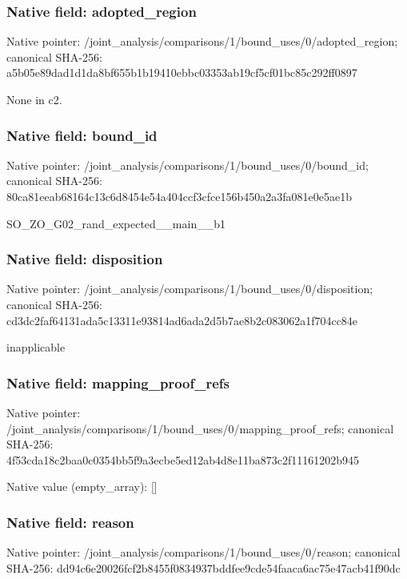 \documentclass[10pt,a4paper]{article}
\begin{document}
\subsubsection{Native field: adopted\_\allowbreak{}region}
Native pointer: /joint\_\allowbreak{}analysis/comparisons/1/bound\_\allowbreak{}uses/0/adopted\_\allowbreak{}region; canonical SHA-256: a5b05e89dad1d1da8bf655b1b19410ebbc03353ab19cf5cf01bc85c292ff0897

\begingroup\raggedright\sloppy None in c2.\par\endgroup

\subsubsection{Native field: bound\_\allowbreak{}id}
Native pointer: /joint\_\allowbreak{}analysis/comparisons/1/bound\_\allowbreak{}uses/0/bound\_\allowbreak{}id; canonical SHA-256: 80ca81eeab68164c13c6d8454e54a404ccf3cfce156b450a2a3fa081e0e5ae1b

\begingroup\raggedright\sloppy SO\_\allowbreak{}ZO\_\allowbreak{}G02\_\allowbreak{}rand\_\allowbreak{}expected\_\allowbreak{}\_\allowbreak{}main\_\allowbreak{}\_\allowbreak{}b1\par\endgroup

\subsubsection{Native field: disposition}
Native pointer: /joint\_\allowbreak{}analysis/comparisons/1/bound\_\allowbreak{}uses/0/disposition; canonical SHA-256: cd3dc2faf64131ada5c13311e93814ad6ada2d5b7ae8b2c083062a1f704cc84e

\begingroup\raggedright\sloppy inapplicable\par\endgroup

\subsubsection{Native field: mapping\_\allowbreak{}proof\_\allowbreak{}refs}
Native pointer: /joint\_\allowbreak{}analysis/comparisons/1/bound\_\allowbreak{}uses/0/mapping\_\allowbreak{}proof\_\allowbreak{}refs; canonical SHA-256: 4f53cda18c2baa0c0354bb5f9a3ecbe5ed12ab4d8e11ba873c2f11161202b945

Native value (empty\_\allowbreak{}array): []

\subsubsection{Native field: reason}
Native pointer: /joint\_\allowbreak{}analysis/comparisons/1/bound\_\allowbreak{}uses/0/reason; canonical SHA-256: dd94c6e20026fcf2b8455f0834937bddfee9cde54faaca6ac75e47acb41f90dc
\end{document}
